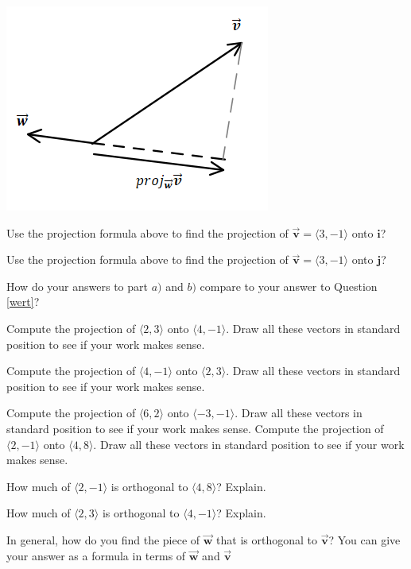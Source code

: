 \begin{info}
\begin{center} \includegraphics[scale=.75]{projvect2.png} \end{center}
\end{info}

\bq \be
\item Use the projection formula above to find the projection of $\vec{\textbf{v}}=\langle 3,-1\rangle$ onto $\textbf{i}$?
\item Use the projection formula above to find the projection of $\vec{\textbf{v}}=\langle 3,-1\rangle$ onto $\textbf{j}$?
\item How do your answers to part $a)$ and $b)$ compare to your answer to Question \ref{wert}?
\ee \eq

\bq Compute the projection of $\langle 2,3\rangle$ onto $\langle 4,-1\rangle$. Draw all these vectors in standard position to see if your work makes sense.
\eq

\bq Compute the projection of $\langle 4,-1\rangle$ onto $\langle 2,3\rangle$. Draw all these vectors in standard position to see if your work makes sense.
\eq

\bq Compute the projection of $\langle 6,2\rangle$ onto $\langle -3,-1\rangle$. Draw all these vectors in standard position to see if your work makes sense.
\eq
\bq Compute the projection of $\langle 2,-1\rangle$ onto $\langle 4,8\rangle$. Draw all these vectors in standard position to see if your work makes sense.
\eq

\bq How much of $\langle 2,-1\rangle$ is orthogonal to $\langle 4,8\rangle$? Explain.
\eq

\bq How much of $\langle 2,3\rangle$ is orthogonal to $\langle 4,-1\rangle$? Explain.
\eq

\bq In general, how do you find the piece of $\vec{\textbf{w}}$ that is orthogonal to $\vec{\textbf{v}}$? You can give your answer as a formula in terms of $\vec{\textbf{w}}$ and $\vec{\textbf{v}}$
\eq

